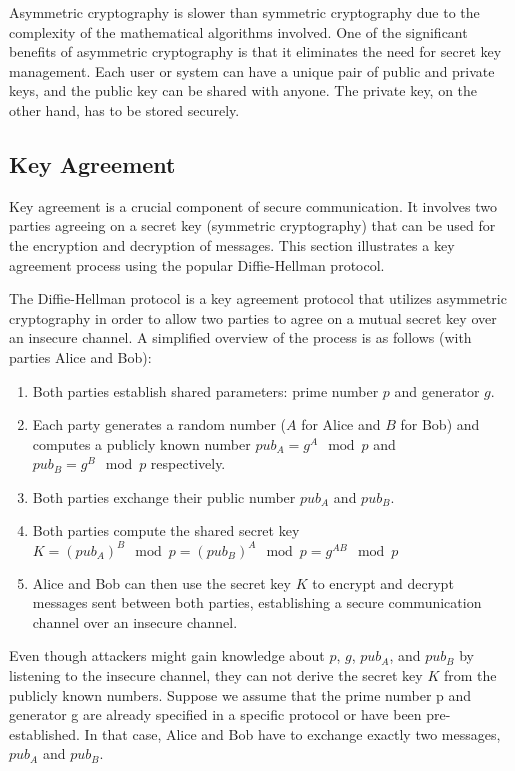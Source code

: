 Asymmetric cryptography is slower than symmetric cryptography due to the
complexity of the mathematical algorithms involved. One of the significant
benefits of asymmetric cryptography is that it eliminates the need for secret
key management. Each user or system can have a unique pair of public and private
keys, and the public key can be shared with anyone. The private key, on the
other hand, has to be stored securely.

\subsection{Key Agreement}
\label{sec:key-agreement}

Key agreement is a crucial component of secure communication. It involves two
parties agreeing on a secret key (symmetric cryptography) that can be used for
the encryption and decryption of messages. This section illustrates a key
agreement process using the popular Diffie-Hellman protocol.

The Diffie-Hellman protocol is a key agreement protocol that utilizes asymmetric
cryptography in order to allow two parties to agree on a mutual secret key over
an insecure channel. A simplified overview of the process is as follows (with
parties Alice and Bob):

\begin{enumerate}
  \item Both parties establish shared parameters: prime number $p$ and generator
        $g$.
  \item Each party generates a random number ($A$ for Alice and $B$ for Bob) and
        computes a publicly known number $pub_A = g^A \mod p$ and $pub_B = g^B
          \mod p$ respectively.
  \item Both parties exchange their public number $pub_A$ and $pub_B$.
  \item Both parties compute the shared secret key $K = (pub_A)^B \mod p =
          (pub_B)^A \mod p = g^{AB} \mod p$
  \item Alice and Bob can then use the secret key $K$ to encrypt and decrypt
        messages sent between both parties, establishing a secure communication
        channel over an insecure channel.
\end{enumerate}

Even though attackers might gain knowledge about $p$, $g$, $pub_A$, and $pub_B$
by listening to the insecure channel, they can not derive the secret key $K$
from the publicly known numbers. Suppose we assume that the prime number p and
generator g are already specified in a specific protocol or have been
pre-established. In that case, Alice and Bob have to exchange exactly two
messages, $pub_A$ and $pub_B$.

